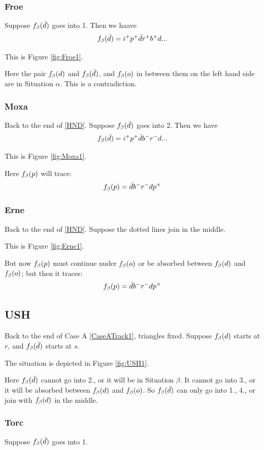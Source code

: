 \subsubsection{Froe}\label{Froe}
Suppose $f_\beta(\bar{d})$ goes into 1. Then we haave
\[
f_\beta(\bar{d}) = i^+ p^+ \bar{d} r^+ b^+ d...
\]

This is Figure \ref{fig:Froe1}.

Here the pair $f_\beta(d)$ and $f_\beta(\bar{d})$, and $f_\beta(o)$ in between them on the left hand side are in Situation $\alpha$. This is a contradiction.

\subsubsection{Moxa}\label{Moxa}
Back to the end of \ref{HND}. Suppose $f_\beta(\bar{d})$ goes into 2. Then we have
\[
f_\beta(\bar{d}) = i^+ p^+ \bar{d} b^- r^- d...
\]

This is Figure \ref{fig:Moxa1}.

Here $f_\beta(p)$ will trace:
\[
f_\beta(p) = \bar{d} b^- r^- d p^\times
\]

\subsubsection{Erne}\label{Erne}
Back to the end of \ref{HND}. Suppose the dotted lines join in the middle.

This is Figure \ref{fig:Erne1}. 

But now $f_\beta(p)$ must continue nuder $f_\beta(o)$ or be absorbed between $f_\beta(d)$ and $f_\beta(o)$; but then it traces:
\[
f_\beta(p) = \bar{d} b^- r^- d p^\times
\]

\subsection{USH}\label{USH}
Back to the end of Case A \ref{CaseATrack1}, triangles fixed. Suppose $f_\beta(d)$ starts at $r$, and $f_\beta(\bar{d})$ starts at $s$.

The situation is depicted in Figure \ref{fig:USH1}.

Here $f_\beta(\bar{d})$ cannot go into 2., or it will be in Situation $\beta$. It cannot go into 3., or it will be absorbed between $f_\beta(d)$ and $f_\beta(o)$. So $f_\beta(\bar{d})$ can only go into 1., 4., or join with $f_\beta(d)$ in the middle.

\subsubsection{Torc}\label{Torc}
Suppose $f_\beta(\bar{d})$ goes into 1. 

